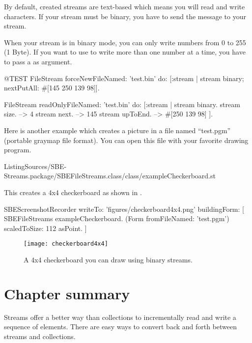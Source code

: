 \documentclass[a4paper,10pt,twoside]{book}
\begin{document}
By default, created streams are text-based which means you will read
and write characters. If your stream must be binary, you have to send
the message  to your stream.

When your stream is in binary mode, you can only write numbers from 0
to 255 (1 Byte). If you want to use  to write more
than one number at a time, you have to pass a  as
argument.

\begin{code}{@TEST}
FileStream
  forceNewFileNamed: 'test.bin'
  do: [:stream |
          stream
            binary;
            nextPutAll: #[145 250 139 98]].

FileStream
  readOnlyFileNamed: 'test.bin'
  do: [:stream |
          stream binary.
          stream size.         --> 4
          stream next.         --> 145
          stream upToEnd. --> #[250 139 98]
      ].
\end{code}

Here is another example which creates a picture in a file named
``test.pgm'' (portable graymap file format). You can open this file with your favorite drawing program.

%
{ListingSources/SBE-Streams.package/SBEFileStreams.class/class/exampleCheckerboard.st}

This creates a 4x4 checkerboard as shown in .

\begin{ExecuteSmalltalkScript}
SBEScreenshotRecorder writeTo: 'figures/checkerboard4x4.png' buildingForm: [
	SBEFileStreams exampleCheckerboard.
	(Form fromFileNamed: 'test.pgm') scaledToSize: 112 asPoint.
]
\end{ExecuteSmalltalkScript}
\begin{figure}[!ht]
\centerline{\texttt{[image: checkerboard4x4]}}
\caption{A 4x4 checkerboard you can draw using binary streams.}
\label{fig:checkerboard4x4}
\vspace{.2in}
\end{figure}

\section{Chapter summary}

Streams offer a better way than collections to incrementally read and write a sequence of elements. There are easy ways to convert back and forth between streams and collections.
\end{document}
